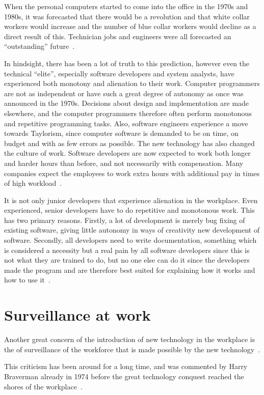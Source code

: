 \documentclass[a4paper,12pt,titlepage]{article}
\begin{document}
  When the personal computers started to come into the office in the 1970s
  and 1980s, it was forecasted that there would be a
  revolution and that white collar workers would increase and the number of
  blue collar workers would decline as a direct result of this. Technician
  jobs and engineers were all forecasted an ``outstanding''
  future~\cite[42]{ek}.

  In hindsight, there has been a lot of truth to
  this prediction, however even the technical ``elite'', especially software
  developers and system analysts, have experienced
  both monotony and alienation to their work. Computer programmers
  are not as independent or have such a great degree of autonomy as
  once was announced in the 1970s. Decisions about design and
  implementation are made elsewhere, and the computer programmers therefore
  often perform monotonous and repetitive programming tasks.
  Also, software engineers experience a move towards Taylorism, since computer
  software is demanded to be on time, on budget and with as few errors
  as possible. The new technology has also changed the culture
  of work. Software developers are now expected to work both
  longer and harder hours than before, and not necessarily with
  compensation. Many companies expect the employees to work
  extra hours with additional pay in times of high
  workload~\cite[143-154]{brp}.

  It is not only junior developers that experience alienation in
  the workplace. Even experienced, senior developers have to
  do repetitive and monotonous work. This has two primary
  reasons. Firstly, a lot of development is merely bug fixing
  of existing software, giving little autonomy in ways of creativity
  new development of software. Secondly, all developers
  need to write documentation, something which is
  considered a necessity but a real pain by
  all software developers since this is not what they are trained
  to do, but no one else can do it since the developers made the
  program and are therefore best suited for explaining how
  it works and how to use it~\cite[153]{brp}.

  \section{Surveillance at work}
  Another great concern of the introduction of new
  technology in the workplace is the of surveillance of the
  workforce that is made possible by the new technology~\cite[173]{ch}.

  This criticism has been around for a long time, and
  was commented by Harry Braverman already in 1974
  before the great technology conquest reached the shores
  of the workplace~\cite[77]{ahdb}. 
\end{document}
